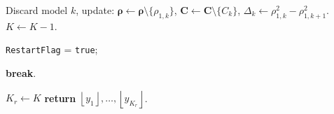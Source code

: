 \begin{algorithm}[!ht]
{{{{    Discard model $k$, update:  $\boldsymbol{\rho} \leftarrow \boldsymbol{\rho} \setminus \{\rho_{1,k}\}$, $\boldsymbol{C} \leftarrow \boldsymbol{C} \setminus \{C_k\}$, $\Delta_k \leftarrow \rho_{1,k}^2 - \rho_{1,k+1}^2$.\;
    $K \leftarrow K - 1$.\;

    {\tt RestartFlag} = {\tt true}; \;

    \textbf{break}.\;
    }
    
    
}
}
}
$K_r \leftarrow K$\;
\textbf{return} $\left\lfloor y_1 \right\rfloor, \dots, \left\lfloor y_{K_r} \right\rfloor$.
\end{algorithm}










    


        


